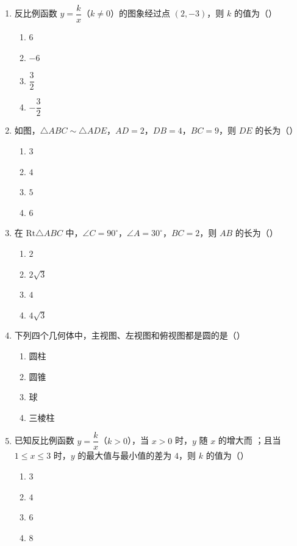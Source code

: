 \documentclass[12pt, a4paper]{ctexart}
\begin{document}
\begin{enumerate}[label=\arabic*.]
\item 反比例函数 $y = \dfrac{k}{x}$（$k \neq 0$）的图象经过点 $(2, -3)$，则 $k$ 的值为（\quad）
\begin{enumerate}[label=\Alph*.]
\item $6$
\item $-6$
\item $\dfrac{3}{2}$
\item $-\dfrac{3}{2}$
\end{enumerate}

\item 如图，$\triangle ABC \sim \triangle ADE$，$AD = 2$，$DB = 4$，$BC = 9$，则 $DE$ 的长为（\quad）
\begin{enumerate}[label=\Alph*.]
\item $3$
\item $4$
\item $5$
\item $6$
\end{enumerate}

\item 在 $\text{Rt}\triangle ABC$ 中，$\angle C = 90^\circ$，$\angle A = 30^\circ$，$BC = 2$，则 $AB$ 的长为（\quad）
\begin{enumerate}[label=\Alph*.]
\item $2$
\item $2\sqrt{3}$
\item $4$
\item $4\sqrt{3}$
\end{enumerate}

\item 下列四个几何体中，主视图、左视图和俯视图都是圆的是（\quad）
\begin{enumerate}[label=\Alph*.]
\item 圆柱
\item 圆锥
\item 球
\item 三棱柱
\end{enumerate}

\item 已知反比例函数 $y = \dfrac{k}{x}$（$k > 0$），当 $x > 0$ 时，$y$ 随 $x$ 的增大而 \underline{\hspace{1cm}}；且当 $1 \leqslant x \leqslant 3$ 时，$y$ 的最大值与最小值的差为 $4$，则 $k$ 的值为（\quad）
\begin{enumerate}[label=\Alph*.]
\item $3$
\item $4$
\item $6$
\item $8$
\end{enumerate}

\end{enumerate}
\end{document}
